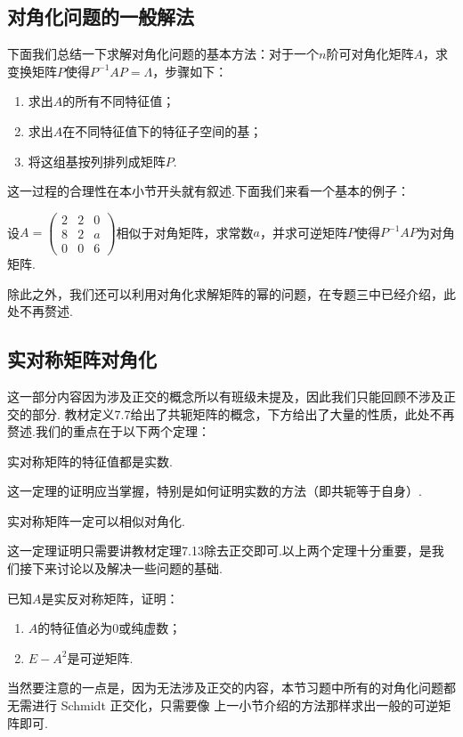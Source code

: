 \subsection{对角化问题的一般解法}
下面我们总结一下求解对角化问题的基本方法：对于一个$n$阶可对角化矩阵$A$，求变换矩阵$P$使得$P^{-1}AP=\Lambda$，步骤如下：
\begin{enumerate}
    \item 求出$A$的所有不同特征值；

    \item 求出$A$在不同特征值下的特征子空间的基；

    \item 将这组基按列排列成矩阵$P$.
\end{enumerate}

这一过程的合理性在本小节开头就有叙述.下面我们来看一个基本的例子：
\begin{example}
    设$A=\begin{pmatrix}
        2 & 2 & 0 \\ 8 & 2 & a \\ 0 & 0 & 6
    \end{pmatrix}$相似于对角矩阵，求常数$a$，并求可逆矩阵$P$使得$P^{-1}AP$为对角矩阵.
\end{example}
除此之外，我们还可以利用对角化求解矩阵的幂的问题，在专题三中已经介绍，此处不再赘述.

\subsection{实对称矩阵对角化}
这一部分内容因为涉及正交的概念所以有班级未提及，因此我们只能回顾不涉及正交的部分.
教材定义7.7给出了共轭矩阵的概念，下方给出了大量的性质，此处不再赘述.我们的重点在于以下两个定理：
\begin{theorem}
    实对称矩阵的特征值都是实数.
\end{theorem}
这一定理的证明应当掌握，特别是如何证明实数的方法（即共轭等于自身）.
\begin{theorem}
    实对称矩阵一定可以相似对角化.
\end{theorem}
这一定理证明只需要讲教材定理7.13除去正交即可.以上两个定理十分重要，是我们接下来讨论以及解决一些问题的基础.
\begin{example}
    已知$A$是实反对称矩阵，证明：
    \begin{enumerate}
        \item $A$的特征值必为0或纯虚数；

        \item $E-A^2$是可逆矩阵.
    \end{enumerate}
\end{example}
当然要注意的一点是，因为无法涉及正交的内容，本节习题中所有的对角化问题都无需进行 Schmidt 正交化，只需要像
上一小节介绍的方法那样求出一般的可逆矩阵即可.
